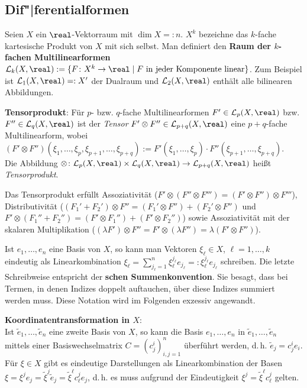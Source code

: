 \pagebreak

\subsection{%
    Dif"|ferentialformen%
}

Seien $X$ ein $\real$-Vektorraum mit $\dim X =: n$.
$X^k$ bezeichne das $k$-fache kartesische Produkt von $X$ mit sich selbst.
Man definiert den \textbf{Raum der $k$-fachen Multilinearformen} \\
$\L_k(X, \real) := \{F\colon X^k \rightarrow \real \;|\;
F \text{ in jeder Komponente linear}\}$.
Zum Beispiel ist $\L_1(X, \real) =: X'$ der Dualraum und
$\L_2(X, \real)$ enthält alle bilinearen Abbildungen.

\textbf{Tensorprodukt}:
Für $p$- bzw. $q$-fache Multilinearformen $F' \in \L_p(X, \real)$
bzw. $F'' \in \L_q(X, \real)$ ist der \emph{Tensor}
$F' \otimes F'' \in \L_{p+q}(X, \real)$ eine $p + q$-fache Multilinearform,
wobei \\
$(F' \otimes F'')(\xi_1, \dotsc, \xi_p, \xi_{p+1}, \dotsc, \xi_{p+q}) :=
F'(\xi_1, \dotsc, \xi_p) \cdot F''(\xi_{p+1}, \dotsc, \xi_{p+q})$. \\
Die Abbildung $\otimes\colon \L_p(X, \real) \times \L_q(X, \real)
\rightarrow \L_{p+q}(X, \real)$ heißt \emph{Tensorprodukt}.

Das Tensorprodukt erfüllt Assoziativität
($F' \otimes (F'' \otimes F''') = (F' \otimes F'') \otimes F'''$),
Distributivität ($(F_1' + F_2') \otimes F'' =
(F_1' \otimes F'') + (F_2' \otimes F'')$ und
$F' \otimes (F_1'' + F_2'') =
(F' \otimes F_1'') + (F' \otimes F_2'')$) sowie
Assoziativität mit der skalaren Multiplikation
($(\lambda F') \otimes F'' = F' \otimes (\lambda F'') =
\lambda (F' \otimes F'')$).

\linie

Ist $e_1, \dotsc, e_n$ eine Basis von $X$, so kann man Vektoren
$\xi_\ell \in X$, $\ell = 1, \dotsc, k$ eindeutig als Linearkombination
$\xi_\ell = \sum_{j_\ell=1}^n \xi_\ell^{j_\ell} e_{j_\ell} =:
\xi_\ell^{j_\ell} e_{j_\ell}$ schreiben.
Die letzte Schreibweise entspricht der
\textbf{schen Summenkonvention}.
Sie besagt, dass bei Termen, in denen Indizes doppelt auftauchen,
über diese Indizes summiert werden muss.
Diese Notation wird im Folgenden exzessiv angewandt.

\textbf{Koordinatentransformation in $X$}: \\
Ist $\widetilde{e}_1, \dotsc, \widetilde{e}_n$ eine zweite Basis von $X$,
so kann die Basis $e_1, \dotsc, e_n$ in
$\widetilde{e}_1, \dotsc, \widetilde{e}_n$ mittels einer Basiswechselmatrix
$C = (c_j^i)_{i,j=1}^n$ überführt werden,
d.\,h. $\widetilde{e}_j = c_j^i e_i$.
Für $\xi \in X$ gibt es eindeutige Darstellungen als Linearkombination der
Basen $\xi = \xi^j e_j = \widetilde{\xi}^j \widetilde{e}_j =
\widetilde{\xi}^\ell c_\ell^j e_j$, d.\,h. es muss aufgrund der Eindeutigkeit
$\xi^j = \widetilde{\xi}^\ell c_\ell^j$ gelten.

